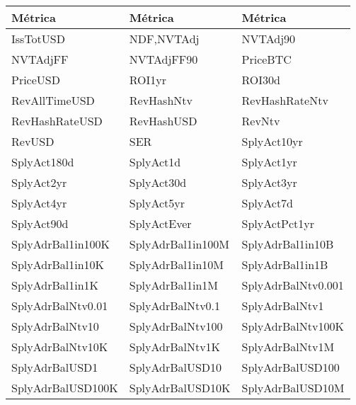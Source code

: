 \begin{table}[ht]
	\centering
		\begin{tabular}{p{5cm} p{5cm} p{5cm}}
		\toprule
		\textbf{Métrica} & \textbf{Métrica} & \textbf{Métrica}\\
		\midrule
		IssTotUSD & NDF,NVTAdj &
		NVTAdj90 \\
		
		NVTAdjFF &
		NVTAdjFF90 & PriceBTC \\
		
		PriceUSD & ROI1yr &
		ROI30d \\
		
		RevAllTimeUSD &
		RevHashNtv & RevHashRateNtv \\
		
		RevHashRateUSD & RevHashUSD &
		RevNtv \\
		
		RevUSD &
		SER & SplyAct10yr \\
		
		SplyAct180d & SplyAct1d &
		SplyAct1yr \\
		
		SplyAct2yr & SplyAct30d & SplyAct3yr \\
		
		SplyAct4yr & SplyAct5yr &
		SplyAct7d \\
		
		SplyAct90d &
		SplyActEver & SplyActPct1yr \\
		
		SplyAdrBal1in100K & SplyAdrBal1in100M &
		SplyAdrBal1in10B \\
		
		SplyAdrBal1in10K &
		SplyAdrBal1in10M & SplyAdrBal1in1B \\
		
		SplyAdrBal1in1K & SplyAdrBal1in1M &
		SplyAdrBalNtv0.001 \\
		
		SplyAdrBalNtv0.01 &
		SplyAdrBalNtv0.1 & SplyAdrBalNtv1 \\
		
		SplyAdrBalNtv10 & SplyAdrBalNtv100 &
		SplyAdrBalNtv100K \\
		
		SplyAdrBalNtv10K &
		SplyAdrBalNtv1K & SplyAdrBalNtv1M \\
		
		SplyAdrBalUSD1 & SplyAdrBalUSD10 &
		SplyAdrBalUSD100 \\
		
		SplyAdrBalUSD100K &
		SplyAdrBalUSD10K & SplyAdrBalUSD10M \\
		

\end{tabular}
\end{table}
